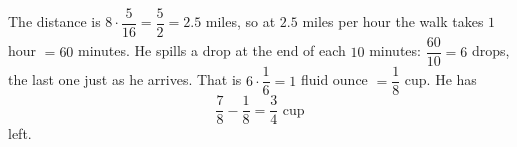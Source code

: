 The distance is $8\cdot\dfrac{5}{16}=\dfrac52=2.5$ miles, so at $2.5$ miles per hour the walk takes $1$ hour $=60$ minutes. He spills a drop at the end of each $10$ minutes: $\dfrac{60}{10}=6$ drops, the last one just as he arrives. That is $6\cdot\dfrac16=1$ fluid ounce $=\dfrac18$ cup. He has
\[\dfrac78-\dfrac18=\boxed{\dfrac34\text{ cup}}\]
left.
